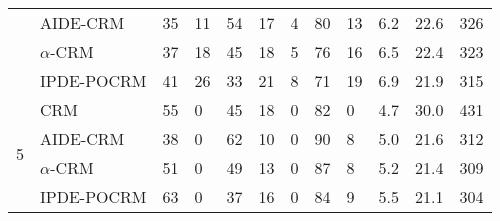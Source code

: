 \begin{tabular*}{\textwidth}{@{\extracolsep\fill}clllllllllll@{\extracolsep\fill}}
 & AIDE-CRM & 35 & 11 & 54 & 17 & 4 & 80 & 13 & 6.2 & 22.6 & 326\\
 & $\alpha$-CRM & 37 & 18 & 45 & 18 & 5 & 76 & 16 & 6.5 & 22.4 & 323\\
 & IPDE-POCRM & 41 & 26 & 33 & 21 & 8 & 71 & 19 & 6.9 & 21.9 & 315\\
\midrule
\multirow{4}{2em}{5} & CRM & 55 & 0 & 45 & 18 & 0 & 82 & 0 & 4.7 & 30.0 & 431\\
 & AIDE-CRM & 38 & 0 & 62 & 10 & 0 & 90 & 8 & 5.0 & 21.6 & 312\\
 & $\alpha$-CRM & 51 & 0 & 49 & 13 & 0 & 87 & 8 & 5.2 & 21.4 & 309\\
 & IPDE-POCRM & 63 & 0 & 37 & 16 & 0 & 84 & 9 & 5.5 & 21.1 & 304\\
\bottomrule
\end{tabular*}
